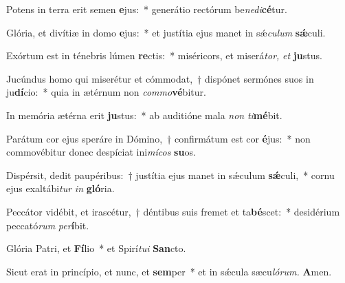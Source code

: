 \item Potens in terra erit semen \textbf{e}jus:~* generátio rectórum be\hspace{0.03em}\textit{nedi}\textbf{cé}tur.
\item Glória, et divítiæ in domo \textbf{e}jus:~* et justítia ejus manet in sǽ\hspace{0.03em}\textit{culum} \textbf{sǽ}culi.
\item Exórtum est in ténebris lúmen \textbf{re}ctis:~* miséricors, et miserá\hspace{0.03em}\textit{tor,} \textit{et} \textbf{ju}stus.
\item Jucúndus homo qui miserétur et cómmodat,~† dispónet sermónes suos in ju\textbf{dí}cio:~* quia in ætérnum non \textit{commo}\textbf{vé}bitur.
\item In memória ætérna erit \textbf{ju}stus:~* ab auditióne mala \textit{non} \textit{ti}\textbf{mé}bit.
\item Parátum cor ejus speráre in Dómino,~† confirmátum est cor \textbf{é}jus:~* non commovébitur donec despíciat ini\textit{mícos} \textbf{su}os.
\item Dispérsit, dedit paupéribus:~† justítia ejus manet in sǽculum \textbf{sǽ}culi,~* cornu ejus exaltábi\hspace{0.03em}\textit{tur} \textit{in} \textbf{gló}ria.
\item Peccátor vidébit, et irascétur,~† déntibus suis fremet et ta\textbf{bé}scet:~* desidérium peccató\textit{rum} \textit{per}\textbf{í}bit.
\item Glória Patri, et \textbf{Fí}lio~* et Spirí\hspace{0.03em}\textit{tui} \textbf{San}cto.
\item Sicut erat in princípio, et nunc, et \textbf{sem}per~* et in sǽcula sæcu\hspace{0.03em}\textit{lórum.} \textbf{A}men.